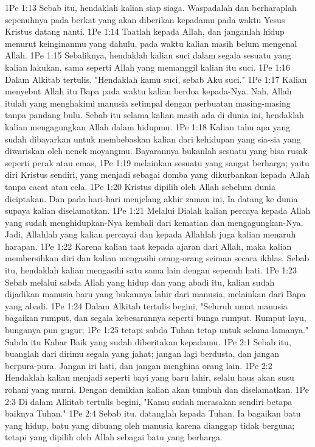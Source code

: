 1Pe 1:13  Sebab itu, hendaklah kalian siap siaga. Waspadalah dan berharaplah sepenuhnya pada berkat yang akan diberikan kepadamu pada waktu Yesus Kristus datang nanti.
1Pe 1:14  Taatlah kepada Allah, dan janganlah hidup menurut keinginanmu yang dahulu, pada waktu kalian masih belum mengenal Allah.
1Pe 1:15  Sebaliknya, hendaklah kalian suci dalam segala sesuatu yang kalian lakukan, sama seperti Allah yang memanggil kalian itu suci.
1Pe 1:16  Dalam Alkitab tertulis, "Hendaklah kamu suci, sebab Aku suci."
1Pe 1:17  Kalian menyebut Allah itu Bapa pada waktu kalian berdoa kepada-Nya. Nah, Allah itulah yang menghakimi manusia setimpal dengan perbuatan masing-masing tanpa pandang bulu. Sebab itu selama kalian masih ada di dunia ini, hendaklah kalian mengagungkan Allah dalam hidupmu.
1Pe 1:18  Kalian tahu apa yang sudah dibayarkan untuk membebaskan kalian dari kehidupan yang sia-sia yang diwariskan oleh nenek moyangmu. Bayarannya bukanlah sesuatu yang bisa rusak seperti perak atau emas,
1Pe 1:19  melainkan sesuatu yang sangat berharga; yaitu diri Kristus sendiri, yang menjadi sebagai domba yang dikurbankan kepada Allah tanpa cacat atau cela.
1Pe 1:20  Kristus dipilih oleh Allah sebelum dunia diciptakan. Dan pada hari-hari menjelang akhir zaman ini, Ia datang ke dunia supaya kalian diselamatkan.
1Pe 1:21  Melalui Dialah kalian percaya kepada Allah yang sudah menghidupkan-Nya kembali dari kematian dan mengagungkan-Nya. Jadi, Allahlah yang kalian percayai dan kepada Allahlah juga kalian menaruh harapan.
1Pe 1:22  Karena kalian taat kepada ajaran dari Allah, maka kalian membersihkan diri dan kalian mengasihi orang-orang seiman secara ikhlas. Sebab itu, hendaklah kalian mengasihi satu sama lain dengan sepenuh hati.
1Pe 1:23  Sebab melalui sabda Allah yang hidup dan yang abadi itu, kalian sudah dijadikan manusia baru yang bukannya lahir dari manusia, melainkan dari Bapa yang abadi.
1Pe 1:24  Dalam Alkitab tertulis begini, "Seluruh umat manusia bagaikan rumput, dan segala kebesarannya seperti bunga rumput. Rumput layu, bunganya pun gugur;
1Pe 1:25  tetapi sabda Tuhan tetap untuk selama-lamanya." Sabda itu Kabar Baik yang sudah diberitakan kepadamu.
1Pe 2:1  Sebab itu, buanglah dari dirimu segala yang jahat; jangan lagi berdusta, dan jangan berpura-pura. Jangan iri hati, dan jangan menghina orang lain.
1Pe 2:2  Hendaklah kalian menjadi seperti bayi yang baru lahir, selalu haus akan susu rohani yang murni. Dengan demikian kalian akan tumbuh dan diselamatkan.
1Pe 2:3  Di dalam Alkitab tertulis begini, "Kamu sudah merasakan sendiri betapa baiknya Tuhan."
1Pe 2:4  Sebab itu, datanglah kepada Tuhan. Ia bagaikan batu yang hidup, batu yang dibuang oleh manusia karena dianggap tidak berguna; tetapi yang dipilih oleh Allah sebagai batu yang berharga.

